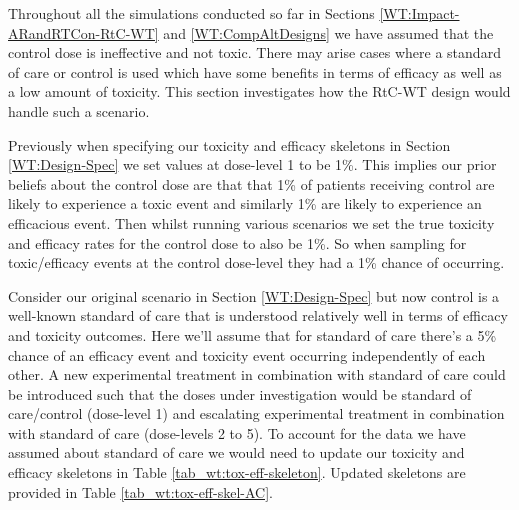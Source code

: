  Throughout all the simulations conducted so far in Sections \ref{WT:Impact-ARandRTCon-RtC-WT} and \ref{WT:CompAltDesigns} we have assumed that the control dose is ineffective and not toxic. There may arise cases where a standard of care or control is used which have some benefits in terms of efficacy as well as a low amount of toxicity. This section investigates how the RtC-WT design would handle such a scenario.  
 
 Previously when specifying our toxicity and efficacy skeletons in Section \ref{WT:Design-Spec} we set values at dose-level 1 to be 1\%. This implies our prior beliefs about the control dose are that that 1\% of patients receiving control are likely to experience a toxic event and similarly 1\% are likely to experience an efficacious event. Then whilst running various scenarios we set the true toxicity and efficacy rates for the control dose to also be 1\%. So when sampling for toxic/efficacy events at the control dose-level they had a 1\% chance of occurring.  
 
 Consider our original scenario in Section \ref{WT:Design-Spec} but now control is a well-known standard of care that is understood relatively well in terms of efficacy and toxicity outcomes. Here we'll assume that for standard of care there's a 5\% chance of an efficacy event and toxicity event occurring independently of each other. A new experimental treatment in combination with standard of care could be introduced such that the doses under investigation would be standard of care/control (dose-level 1) and escalating experimental treatment in combination with standard of care (dose-levels 2 to 5). To account for the data we have assumed about standard of care we would need to update our toxicity and efficacy skeletons in Table \ref{tab_wt:tox-eff-skeleton}. Updated skeletons are provided in Table \ref{tab_wt:tox-eff-skel-AC}.    
 
